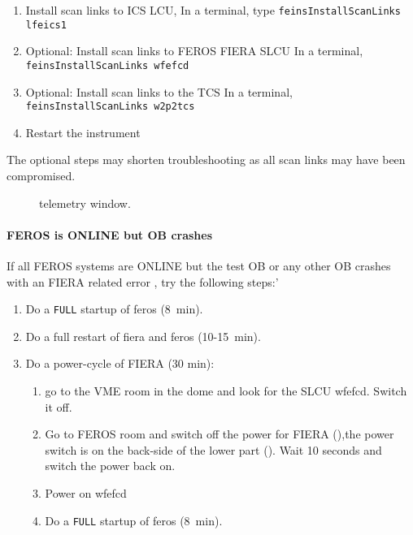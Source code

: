 \documentclass[11pt,fleqn,a4paper]{book}
\begin{document}
\label{proc:ferosscanlinks}
\begin{enumerate}
    \item Install scan links to ICS LCU,
          In a terminal, type \texttt{feinsInstallScanLinks lfeics1}
    \item Optional: Install scan links to FEROS FIERA SLCU
          In a terminal, \texttt{feinsInstallScanLinks wfefcd}
    \item Optional: Install scan links to the TCS
          In a terminal, \texttt{feinsInstallScanLinks w2p2tcs}
    \item Restart the instrument
\end{enumerate}

The optional steps may shorten troubleshooting as all scan links may have been compromised.


\begin{figure}[t!]
\begin{minipage}{0.48\linewidth}
\end{minipage}
\hspace{0.02\linewidth}
\begin{minipage}{0.48\linewidth}
\end{minipage}
\caption[Telemetry window]{\Gls{telemetry} window.}
\end{figure}

\paragraph{FEROS is ONLINE but OB crashes}
\label{proc:feros_fiera_powercycle}
If all FEROS systems are ONLINE but the test OB or any other OB crashes with an FIERA related error , try the following steps:'

\begin{enumerate}
	\item Do a \texttt{FULL} startup of \gls{feros} (8~min).
	\item\label{list:ferosfierarestart} Do a full restart of \gls{fiera} and \gls{feros} (10-15~min).
	\item Do a power-cycle of FIERA (30 min): 
	\label{proc:feros_fiera_powercycle}
	\begin{enumerate}
		\item go to the VME room in the dome and look for the SLCU \gls{wfefcd}. Switch it off.
		\item Go to FEROS room and switch off the power for FIERA (),the power switch is on the back-side of the lower part (). Wait 10 seconds and switch the power back on.
		\item Power on \gls{wfefcd}
		\item Do a \texttt{FULL} startup of \gls{feros} (8~min).
	 \end{enumerate}	
\end{enumerate}
\end{document}
